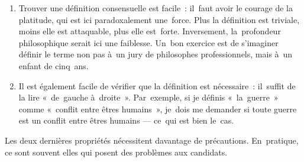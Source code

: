 \documentclass[a4paper,12pt]{report}
\begin{document}
\begin{enumerate}
\item Trouver une définition consensuelle est facile : il faut avoir le
courage de la platitude, qui est ici paradoxalement une force. Plus
la définition est triviale, moins elle est attaquable, plus elle
est forte. Inversement, la profondeur philosophique serait ici une
faiblesse. Un bon exercice est de s'imaginer définir le terme non pas
à un jury de philosophes professionnels, mais à un enfant de
cinq ans.

\item Il est également facile de vérifier que la définition est
nécessaire : il suffit de la lire « de gauche à droite ».
Par exemple, si je définis « la guerre » comme « conflit entre êtres
humains », je dois me demander si toute guerre est un conflit entre
êtres humains --- ce qui est bien le cas.
\end{enumerate}

Les deux dernières propriétés nécessitent davantage de précautions.
En pratique, ce sont souvent elles qui posent des problèmes aux
candidats.
\end{document}
